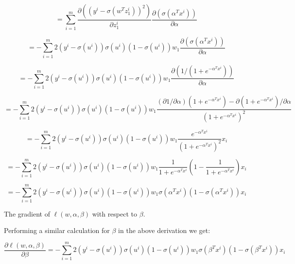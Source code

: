 \documentclass[twoside,10pt]{article}
\begin{document}
\begin{enumerate}
\begin{enumerate}
$$=\sum_{i=1}^m {\frac{\partial ((y^i - \sigma(w^T z^i_1))^2) }{\partial z_1^i} \frac{\partial (\sigma(\alpha^T x^i))}{\partial \alpha}}$$

$$ =- \sum_{i=1}^m {2(y^i - \sigma(u^i))\sigma(u^i)(1-\sigma(u^i)) w_1 \frac{\partial (\sigma(\alpha^T x^i))}{\partial \alpha}}$$

$$=- \sum_{i=1}^m {2(y^i - \sigma(u^i))\sigma(u^i)(1-\sigma(u^i)) w_1 \frac{\partial (1/(1+e^{-\alpha^Tx^i}))}{\partial \alpha}} $$

$$=- \sum_{i=1}^m {2(y^i - \sigma(u^i))\sigma(u^i)(1-\sigma(u^i)) w_1 \frac{(\partial{1}/\partial{\alpha})(1+e^{-\alpha^Tx^i}) -  \partial{(1+e^{-\alpha^Tx^i})} / \partial{\alpha}} {(1+e^{-\alpha^Tx^i})^2}}$$

$$=- \sum_{i=1}^m {2(y^i - \sigma(u^i))\sigma(u^i)(1-\sigma(u^i)) w_1 \frac{ e^{-\alpha^Tx^i}} {(1+e^{-\alpha^Tx^i})^2}x_i}$$

$$=- \sum_{i=1}^m {2(y^i - \sigma(u^i))\sigma(u^i)(1-\sigma(u^i)) w_1 \frac{1}{1+e^{-\alpha^Tx^i}} (1 - \frac{1}{1+e^{-\alpha^Tx^i}})x_i}$$

$$= - \sum_{i=1}^m {2(y^i - \sigma(u^i))\sigma(u^i)(1-\sigma(u^i)) w_1 \sigma(\alpha^T x^i) (1 - \sigma(\alpha^T x^i))x_i}$$

\vspace{2 mm}

The gradient of $\ell(w, \alpha, \beta)$ with respect to $\beta$.

\vspace{2 mm}

Performing a similar calculation for $\beta$ in the above derivation we get:

$$\frac{\partial \ell(w, \alpha, \beta) }{\partial \beta} = 
- \sum_{i=1}^m {2(y^i - \sigma(u^i))\sigma(u^i)(1-\sigma(u^i)) w_1 \sigma(\beta^T x^i) (1 - \sigma(\beta^T x^i))x_i} $$
\vspace{5 mm}
\end{enumerate}
\end{enumerate}
\end{document}
